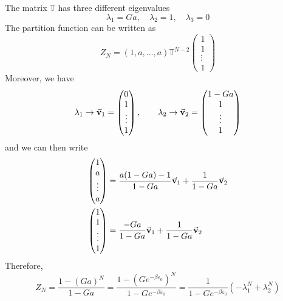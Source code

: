 \documentclass[../../Main/Main.tex]{subfiles}
\begin{document}
The matrix \( \mathbb{T} \) has three different eigenvalues
\begin{equation}
  \lambda _1 = Ga, \quad \lambda _2 =1, \quad \lambda _3 = 0
\end{equation}
The partition function can be written as
\begin{equation}
  Z_N = (1,a, \dots,a) \mathbb{T}^{N-2} \begin{pmatrix}
  1 \\
  1 \\
  \vdots \\
  1
  \end{pmatrix}
\end{equation}
Moreover, we have 
\begin{equation*}
  \lambda _1 \rightarrow \va{v}_1 = \begin{pmatrix}
  0 \\
  1 \\
  \vdots \\
  1
  \end{pmatrix},
  \qquad
  \lambda _2 \rightarrow \va{v}_2 = \begin{pmatrix}
  1-Ga \\
  1 \\
  \vdots \\
  1
  \end{pmatrix}
\end{equation*}
and we can then write
\begin{subequations}
\begin{align*}
  \begin{pmatrix}
  1 \\
  a \\
  \vdots \\
  a
\end{pmatrix}  &= \frac{a(1-Ga)-1}{1-Ga} \va{v}_1 + \frac{1}{1-Ga}\va{v}_2 \\
\begin{pmatrix}
1 \\
1 \\
\vdots \\
1
\end{pmatrix}  &= \frac{-Ga}{1-Ga} \va{v}_1 + \frac{1}{1-Ga}\va{v}_2
\end{align*}
\end{subequations}
Therefore,
\begin{equation}
  Z_N = \frac{1-(Ga)^N}{1-Ga} = \frac{1-(G e^{-\beta \varepsilon _0} )^N}{1-G e^{-\beta \varepsilon _0} }
  = \frac{1}{1-G e^{-\beta \varepsilon _0} } (-\lambda _1^N + \lambda _2^N)
\end{equation}
\end{document}
